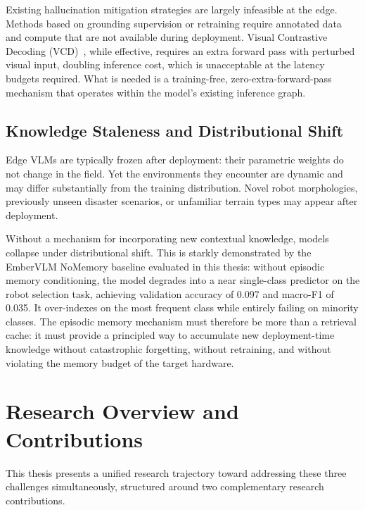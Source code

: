 Existing hallucination mitigation strategies are largely infeasible at the edge. Methods based on grounding supervision or retraining require annotated data and compute that are not available during deployment. Visual Contrastive Decoding (VCD)~\cite{leng2024vcd}, while effective, requires an extra forward pass with perturbed visual input, doubling inference cost, which is unacceptable at the latency budgets required. What is needed is a training-free, zero-extra-forward-pass mechanism that operates within the model's existing inference graph.

\subsection{Knowledge Staleness and Distributional Shift}
\label{subsec:challenge_staleness}

Edge VLMs are typically frozen after deployment: their parametric weights do not change in the field. Yet the environments they encounter are dynamic and may differ substantially from the training distribution. Novel robot morphologies, previously unseen disaster scenarios, or unfamiliar terrain types may appear after deployment.

Without a mechanism for incorporating new contextual knowledge, models collapse under distributional shift. This is starkly demonstrated by the EmberVLM NoMemory baseline evaluated in this thesis: without episodic memory conditioning, the model degrades into a near single-class predictor on the robot selection task, achieving validation accuracy of 0.097 and macro-F1 of 0.035. It over-indexes on the most frequent class while entirely failing on minority classes. The episodic memory mechanism must therefore be more than a retrieval cache: it must provide a principled way to accumulate new deployment-time knowledge without catastrophic forgetting, without retraining, and without violating the memory budget of the target hardware.

\section{Research Overview and Contributions}
\label{sec:intro_contributions}

This thesis presents a unified research trajectory toward addressing these three challenges simultaneously, structured around two complementary research contributions.

